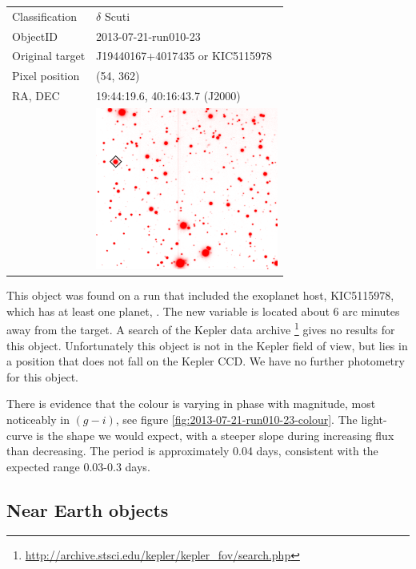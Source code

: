 \begin{tabular}{l l}
  Classification & $\delta$ Scuti \\
  ObjectID & 2013-07-21-run010-23 \\
  Original target & J19440167+4017435 or KIC5115978 \\
  Pixel position & (54, 362) \\
  RA, DEC & 19:44:19.6, 40:16:43.7 (J2000) \\
       & \includegraphics[width=60mm]{images/2013-07-21-run010-23.png} \\
\end{tabular}

This object was found on a run that included the exoplanet host, KIC5115978, which has at least one planet, \citep{KIC5115978}. The new variable is located about 6 arc minutes away from the target. A search of the Kepler data archive \footnote{\url{http://archive.stsci.edu/kepler/kepler_fov/search.php}} gives no results for this object. Unfortunately this object is not in the Kepler field of view, but lies in a position that does not fall on the Kepler CCD. We have no further photometry for this object. 

There is evidence that the colour is varying in phase with magnitude, most noticeably in $(g - i)$, see figure \ref{fig:2013-07-21-run010-23-colour}. The light-curve is the shape we would expect, with a steeper slope during increasing flux than decreasing. The period is approximately 0.04 days, consistent with the expected range 0.03-0.3 days.


\newpage
\subsection{Near Earth objects}


